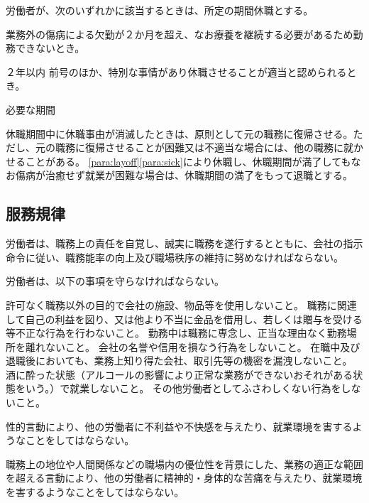 \documentclass[10pt,a4paper,uplatex]{jsarticle}
\begin{document}
労働者が、次のいずれかに該当するときは、所定の期間休職とする。
\label{para:layoff}
\begin{enumerate}
    \itm 業務外の傷病による欠勤が２か月を超え、なお療養を継続する必要があるため勤務できないとき。\par ２年以内
    \label{para:sick}
    \itm 前号のほか、特別な事情があり休職させることが適当と認められるとき。\par 必要な期間
\end{enumerate}
\term
休職期間中に休職事由が消滅したときは、原則として元の職務に復帰させる。ただし、元の職務に復帰させることが困難又は不適当な場合には、他の職務に就かせることがある。
\term
\ref{para:layoff}\ref{para:sick}により休職し、休職期間が満了してもなお傷病が治癒せず就業が困難な場合は、休職期間の満了をもって退職とする。

\subsection{服務規律}

労働者は、職務上の責任を自覚し、誠実に職務を遂行するとともに、会社の指示命令に従い、職務能率の向上及び職場秩序の維持に努めなければならない。

労働者は、以下の事項を守らなければならない。\label{para:obey}
\begin{enumerate}
    \itm 許可なく職務以外の目的で会社の施設、物品等を使用しないこと。
    \itm 職務に関連して自己の利益を図り、又は他より不当に金品を借用し、若しくは贈与を受ける等不正な行為を行わないこと。
    \itm 勤務中は職務に専念し、正当な理由なく勤務場所を離れないこと。
    \itm 会社の名誉や信用を損なう行為をしないこと。
    \itm 在職中及び退職後においても、業務上知り得た会社、取引先等の機密を漏洩しないこと。
    \itm 酒に酔った状態（アルコールの影響により正常な業務ができないおそれがある状態をいう。）で就業しないこと。
    \itm その他労働者としてふさわしくない行為をしないこと。
\end{enumerate}

性的言動により、他の労働者に不利益や不快感を与えたり、就業環境を害するようなことをしてはならない。
\label{para:sexsualharrassment}

職務上の地位や人間関係などの職場内の優位性を背景にした、業務の適正な範囲を超える言動により、他の労働者に精神的・身体的な苦痛を与えたり、就業環境を害するようなことをしてはならない。
\label{para:powerharrassment}
\end{document}

